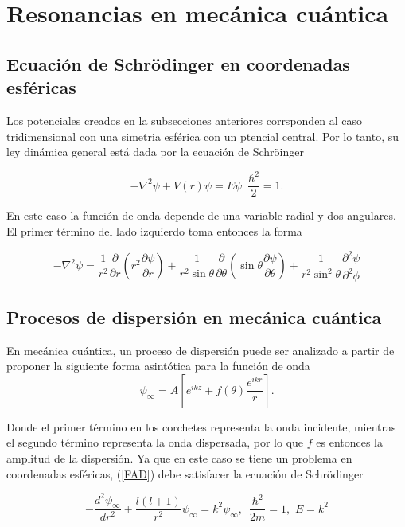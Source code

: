 \chapter{Resonancias en mecánica cuántica}

\section{Ecuación de Schrödinger en coordenadas esféricas}

Los potenciales creados en la subsecciones anteriores corrsponden al caso tridimensional con una simetria esférica con un ptencial central. Por lo tanto, su ley dinámica general está dada por la ecuación de Schröinger

\begin{equation*}
-\nabla^2 \psi + V(r) \psi = E \psi \,\,\, \frac{\hbar^2}{2}= 1.
\end{equation*}

En este caso la función de onda depende de una variable radial y dos angulares. El primer término del lado izquierdo toma entonces la forma

\begin{equation*}
-\nabla^2 \psi = \frac{1}{r^2} \frac{\partial}{\partial r} \left(r^2 \frac{\partial \psi}{\partial r} \right) + \frac{1}{r^2 \sin \theta} \frac{\partial}{\partial \theta} \left(\sin \theta \frac{\partial \psi}{\partial \theta} \right) +  \frac{1}{r^2 \sin^2 \theta} \frac{\partial^2 \psi}{\partial^2 \phi}
\end{equation*}



\section{Procesos de dispersión en mecánica cuántica}

En mecánica cuántica, un proceso de dispersión puede ser analizado a partir de proponer la siguiente forma asintótica para la función de onda
\begin{equation}
	\psi_{\infty} = A \left[e^{i k z} + f(\theta)  \frac{e^{i k r}}{r} \right]. \label{FAD}
\end{equation}

Donde el primer término en los corchetes representa la onda incidente, mientras el segundo término representa la onda dispersada, por lo que $f$ es entonces la amplitud de la dispersión. Ya que en este caso se tiene un problema en coordenadas esféricas, (\ref{FAD}) debe satisfacer la ecuación de Schrödinger 

\begin{equation}
-\frac{d^2\psi_{\infty}}{dr^2} + \frac{l(l+1)}{r^2}\psi_{\infty} = k^2 \psi_{\infty} , \,\,\, \frac{\hbar^2}{2m}=1, \,\, E=k^2
\end{equation}



